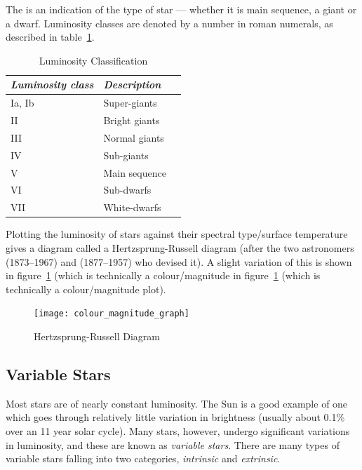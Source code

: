 The  is an indication of the type of star ---
whether it is main sequence, a giant or a dwarf. Luminosity classes are
denoted by a number in roman numerals, as described in table~\ref{tab:luminosityclass}.

\begin{table}[htb]
  \centering
  \begin{tabular}{lll}
\toprule
\emph{Luminosity class} & \emph{Description}\\\midrule
Ia, Ib & Super-giants\\
II     & Bright giants\\
III    & Normal giants\\
IV     & Sub-giants\\
V      & Main sequence\\
VI     & Sub-dwarfs\\
VII    & White-dwarfs\\
\bottomrule
\end{tabular}
\caption{Luminosity Classification}
\label{tab:luminosityclass}
\end{table}

Plotting the luminosity of stars against their spectral type/surface
temperature gives a diagram called a Hertzsprung-Russell diagram
(after the two astronomers  (1873--1967) and 
 (1877--1957) who devised it). A slight variation of this is shown
in figure~\ref{fig:colourmag} (which is technically a colour/magnitude
in figure~\ref{fig:colourmag} (which is technically a colour/magnitude
plot).

\begin{figure}[tp]
\centering\texttt{[image: colour\_magnitude\_graph]}
\caption{Hertzsprung-Russell Diagram}
\label{fig:colourmag}
\end{figure}

\subsection{Variable Stars}
\label{sec:Phenomena:variableStars}

Most stars are of nearly constant luminosity. The Sun is a good example
of one which goes through relatively little variation in brightness
(usually about 0.1\% over an 11 year solar cycle). Many stars, however,
undergo significant variations in luminosity, and these are known as
\emph{variable stars}. There are many types of variable stars falling
into two categories, \emph{intrinsic} and \emph{extrinsic}.

